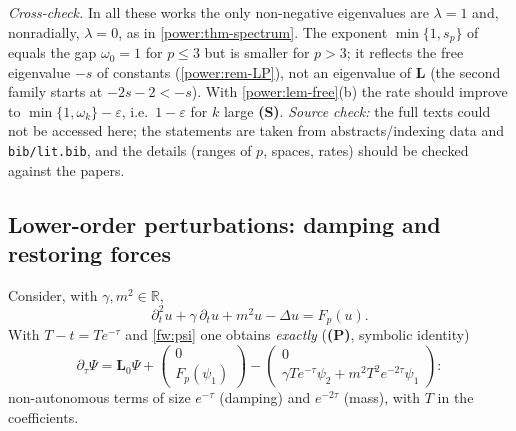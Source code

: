 \emph{Cross-check.} In all these works the only non-negative eigenvalues are
$\lambda=1$ and, nonradially, $\lambda=0$, as in \cref{power:thm-spectrum}. The
exponent $\min\{1,s_p\}$ of \cite{Ostermann2024} equals the gap $\omega_0=1$ for
$p\le3$ but is smaller for $p>3$; it reflects the free eigenvalue $-s$ of
constants (\cref{power:rem-LP}), not an eigenvalue of $\mathbf L$ (the second
family starts at $-2s-2<-s$). With \cref{power:lem-free}(b) the rate should
improve to $\min\{1,\omega_k\}-\varepsilon$, i.e.\ $1-\varepsilon$ for $k$ large
\textbf{(S)}. \emph{Source check:} the full texts could not be accessed here;
the statements are taken from abstracts/indexing data and
\texttt{bib/lit.bib}, and the details (ranges of $p$, spaces, rates) should be
checked against the papers.

\subsection{Lower-order perturbations: damping and restoring forces}
\label{power:subsec-lower}

Consider, with $\gamma,m^2\in\mathbb R$,
\begin{equation}\label{power:eq-pert}
  \partial_t^2u+\gamma\,\partial_tu+m^2u-\Delta u=F_p(u).
\end{equation}
With $T-t=Te^{-\tau}$ and \eqref{fw:psi} one obtains \emph{exactly}
(\textbf{(P)}, symbolic identity)
\begin{equation}\label{power:eq-sim-pert}
  \partial_\tau\Psi=\mathbf L_0\Psi+\begin{pmatrix}0\\F_p(\psi_1)\end{pmatrix}
  -\begin{pmatrix}0\\ \gamma Te^{-\tau}\psi_2+m^2T^2e^{-2\tau}\psi_1\end{pmatrix}:
\end{equation}
non-autonomous terms of size $e^{-\tau}$ (damping) and $e^{-2\tau}$ (mass), with $T$
in the coefficients.

